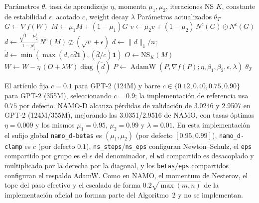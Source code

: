 \begin{algorithm}[H]
\caption{NAMO-D (Extensi\'on Diagonal de NAMO)}
\label{alg:namo-d-es}
\begin{algorithmic}[1]
\Require Parámetros $\theta$, tasa de aprendizaje $\eta$, momenta $\mu_1,\mu_2$, iteraciones NS $K$, constante de estabilidad $\epsilon$, acotado $c$, weight decay $\lambda$
\Ensure Parámetros actualizados $\theta_T$
        \State $G \gets \nabla f(W)$ 
        \State $M \gets \mu_1 M + (1-\mu_1) G$ 
        \State $v \gets \mu_2 v + (1-\mu_2)\,N^c(G)\odot N^c(G)$ 
        \State $d \gets \frac{\sqrt{1-\mu_2^t}}{1-\mu_1^t}\,N^c(M) \oslash (\sqrt{v}+\epsilon)$ 
        \State $\bar d \gets \lVert d\rVert_1/n$; \quad
               $\tilde d \gets \min(\max(d, c\bar d\mathbf 1), (\bar d/c)\mathbf 1)$ 
        \State $O \gets \mathrm{NS}_K(M)$ 
        \State $W \gets W - \eta\,(O + \lambda W)\operatorname{diag}(\tilde d)$ 
    \Else
        \State $P \gets \operatorname{AdamW}(P, \nabla f(P); \eta, \beta_1, \beta_2, \epsilon, \lambda)$ 
    \EndIf
\EndFor
\Return $\theta_T$
\end{algorithmic}
\end{algorithm}

El artículo fija $c=0.1$ para GPT-2 (124M) y barre $c\in\{0.12,0.40,0.75,0.90\}$ para
GPT-2 (355M), seleccionando $c=0.9$; la implementación de referencia usa $0.75$ por
defecto. NAMO-D alcanza pérdidas de validación de 3.0246 y 2.9507 en GPT-2 (124M/355M),
mejorando las 3.0351/2.9516 de NAMO, con tasas óptimas $\eta=0.009$ y los mismos
$\mu_1=0.95$, $\mu_2=0.99$ y $\lambda=0.01$. En esta implementación el sufijo global
\texttt{namo\_d-betas} es $(\mu_1,\mu_2)$ (por defecto $[0.95,0.99]$),
\texttt{namo\_d-clamp} es $c$ (por defecto $0.1$), \texttt{ns\_steps}/\texttt{ns\_eps}
configuran Newton--Schulz, el \texttt{eps} compartido por grupo es el $\epsilon$ del
denominador, el \texttt{wd} compartido es desacoplado y multiplicado por la derecha por
la diagonal, y los \texttt{betas}/\texttt{eps} compartidos configuran el respaldo
AdamW. Como en NAMO, el momentum de Nesterov, el tope del paso efectivo y el escalado
de forma $0.2\sqrt{\max(m,n)}$ de la implementación oficial no forman parte del
Algoritmo~2 y no se implementan.

